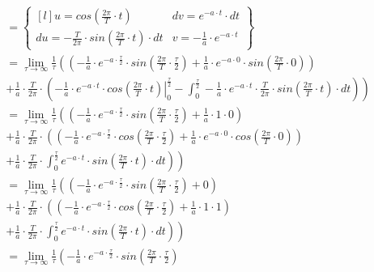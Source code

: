 \begin{task}
\begin{align*}
 &=\begin{Bmatrix*}[l]
 u=cos(\frac{2\pi}{T}\cdot t) & dv = e^{-a \cdot t}\cdot dt\\ 
 du=-\frac{T}{2\pi} \cdot sin(\frac{2\pi}{T}\cdot t)\cdot dt & v=-\frac{1}{a}\cdot e^{-a\cdot t}
 \end{Bmatrix*}\\
 &=\lim_{\tau \rightarrow \infty }\frac{1}{\tau}\left(
 \left( -\frac{1}{a}\cdot e^{-a\cdot \frac{\tau}{2}} \cdot sin \left(\frac{2\pi}{T}\cdot \frac{\tau}{2}\right) + \frac{1}{a}\cdot e^{-a\cdot 0} \cdot sin \left(\frac{2\pi}{T}\cdot 0\right) \right)\right.\\
 &\left.+\frac{1}{a} \cdot \frac{T}{2\pi} \cdot 
 \left(
 \left. -\frac{1}{a}\cdot e^{-a\cdot t} \cdot cos \left(\frac{2\pi}{T}\cdot t\right) \right|_{0}^{\frac{\tau}{2}}
 -\int_{0}^{\frac{\tau}{2}} -\frac{1}{a}\cdot e^{-a\cdot t} \cdot \frac{T}{2\pi} \cdot sin\left(\frac{2\pi}{T}\cdot t\right)\cdot dt
 \right)
 \right)\\
 &=\lim_{\tau \rightarrow \infty }\frac{1}{\tau}\left(
 \left( -\frac{1}{a}\cdot e^{-a\cdot \frac{\tau}{2}} \cdot sin \left(\frac{2\pi}{T}\cdot \frac{\tau}{2}\right) + \frac{1}{a}\cdot 1 \cdot 0 \right)\right.\\
 &\left.+\frac{1}{a} \cdot \frac{T}{2\pi} \cdot 
 \left(
 \left( -\frac{1}{a}\cdot e^{-a\cdot \frac{\tau}{2}} \cdot cos \left(\frac{2\pi}{T}\cdot \frac{\tau}{2}\right) + \frac{1}{a}\cdot e^{-a\cdot 0} \cdot cos \left(\frac{2\pi}{T}\cdot 0\right) \right)
 \right.\right. \\
 &\left.\left.+\frac{1}{a}\cdot \frac{T}{2\pi} \cdot \int_{0}^{\frac{\tau}{2}} e^{-a\cdot t} \cdot  sin\left(\frac{2\pi}{T}\cdot t\right)\cdot dt
 \right)
 \right)\\
 &=\lim_{\tau \rightarrow \infty }\frac{1}{\tau}\left(
 \left( -\frac{1}{a}\cdot e^{-a\cdot \frac{\tau}{2}} \cdot sin \left(\frac{2\pi}{T}\cdot \frac{\tau}{2}\right) + 0 \right)\right.\\
 &\left.+\frac{1}{a} \cdot \frac{T}{2\pi} \cdot 
 \left(
 \left( -\frac{1}{a}\cdot e^{-a\cdot \frac{\tau}{2}} \cdot cos \left(\frac{2\pi}{T}\cdot \frac{\tau}{2}\right) + \frac{1}{a}\cdot 1 \cdot 1 \right)
 \right.\right. \\
 &\left.\left.+\frac{1}{a}\cdot \frac{T}{2\pi} \cdot \int_{0}^{\frac{\tau}{2}} e^{-a\cdot t} \cdot  sin\left(\frac{2\pi}{T}\cdot t\right)\cdot dt
 \right)
 \right)\\
 &=\lim_{\tau \rightarrow \infty }\frac{1}{\tau}\left(
 -\frac{1}{a}\cdot e^{-a\cdot \frac{\tau}{2}} \cdot sin \left(\frac{2\pi}{T}\cdot \frac{\tau}{2}\right)\right.\\

\end{align*}
\end{task}
